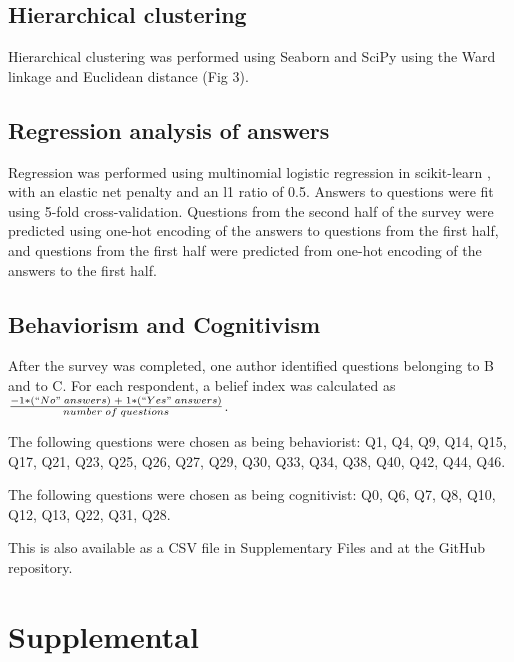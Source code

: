 \documentclass[a4paper, 11pt]{article}
\begin{document}
\subsection*{Hierarchical clustering}
Hierarchical clustering was performed using Seaborn and SciPy \cite{2020SciPy-NMeth,waskom2020seaborn} using the Ward linkage and Euclidean distance (Fig 3).

\subsection*{Regression analysis of answers}
Regression was performed using multinomial logistic regression in scikit-learn \cite{scikit-learn}, with an elastic net penalty and an l1 ratio of 0.5. Answers to questions were fit using 5-fold cross-validation. Questions from the second half of the survey were predicted using one-hot encoding of the answers to questions from the first half, and questions from the first half were predicted from one-hot encoding of the answers to the first half.

\subsection*{Behaviorism and Cognitivism}
After the survey was completed, one author identified questions belonging to B and to C. For each respondent, a belief index was calculated as $\frac{-1 * (``No"\;answers)\; +\; 1*(``Yes"\;answers)}{number\;of\;questions}$.

The following questions were chosen as being behaviorist: Q1, Q4, Q9, Q14, Q15, Q17, Q21, Q23, Q25, Q26, Q27, Q29, Q30, Q33, Q34, Q38, Q40, Q42, Q44, Q46.

The following questions were chosen as being cognitivist: Q0, Q6, Q7, Q8, Q10, Q12, Q13, Q22, Q31, Q28.

This is also available as a CSV file in Supplementary Files and at the GitHub repository.

\section*{Supplemental}


\newpage



\setcounter{figure}{0}
\renewcommand{\thefigure}{S\arabic{figure}}
\end{document}
